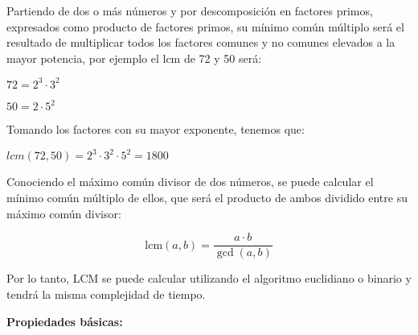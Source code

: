Partiendo de dos o más números y por descomposición en factores primos, expresados como producto de factores primos, su mínimo común múltiplo será el resultado de multiplicar todos los factores comunes y no comunes elevados a la mayor potencia, por ejemplo el lcm de 72 y 50 será:

$72= 2^{3}·3^{2}$

$50= 2·5^{2}$

Tomando los factores con su mayor exponente, tenemos que: 

$lcm(72,50)= 2^{3}·3^{2}·5^{2}=1800$

Conociendo el máximo común divisor de dos números, se puede calcular el mínimo común múltiplo de ellos, que será el producto de ambos dividido entre su máximo común divisor:

$$\text{lcm}(a, b) = \frac{a \cdot b}{\gcd(a, b)}$$

Por lo tanto, LCM se puede calcular utilizando el algoritmo euclidiano o binario y tendrá la misma complejidad de tiempo.

\textbf{Propiedades básicas:}

